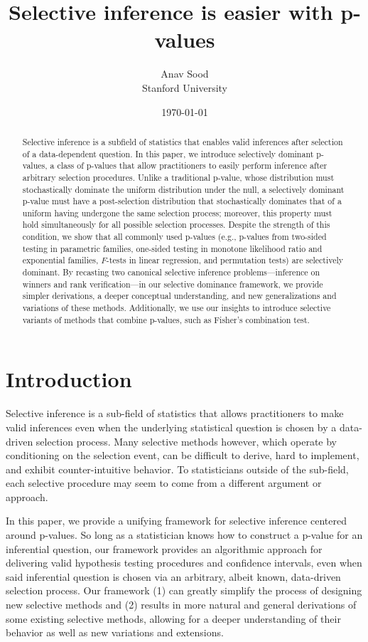 \documentclass{article}
\title{Selective inference is easier with p-values}
\author{Anav Sood\\ Stanford University}
\date{\today}
\begin{document}
\maketitle

\begin{abstract}
Selective inference is a subfield of statistics that enables valid inferences after selection of a data-dependent question. In this paper, we introduce selectively dominant p-values, a class of p-values that allow practitioners to easily perform inference after arbitrary selection procedures. Unlike a traditional p-value, whose distribution must stochastically dominate the uniform distribution under the null, a selectively dominant p-value must have a  post-selection distribution that stochastically dominates that of a uniform having undergone the same selection process; moreover, this property must hold simultaneously for all possible selection processes. Despite the strength of this condition, we show that all commonly used p-values (e.g., p-values from two-sided testing in parametric families, one-sided testing in monotone likelihood ratio and exponential families, $F$-tests in linear regression, and permutation tests) are selectively dominant. By recasting two canonical selective inference problems—inference on winners and rank verification—in our selective dominance framework, we provide simpler derivations, a deeper conceptual understanding, and new generalizations and variations of these methods. Additionally, we use our insights to introduce selective variants of methods that combine p-values, such as Fisher's combination test. 
\end{abstract}


\section{Introduction}

Selective inference is a sub-field of statistics that allows practitioners to make valid inferences even when the underlying statistical question is chosen by a data-driven selection process. Many selective methods however, which operate by conditioning on the selection event, can be difficult to derive, hard to implement, and exhibit counter-intuitive behavior. To statisticians outside of the sub-field, each selective procedure may seem to come from a different argument or approach.

In this paper, we provide a unifying framework for selective inference centered around p-values. So long as a statistician knows how to construct a p-value for an inferential question, our framework provides an algorithmic approach for delivering valid hypothesis testing procedures and confidence intervals, even when said inferential question is chosen via an arbitrary, albeit known, data-driven selection process. Our framework (1) can greatly simplify the process of designing new selective methods and (2) results in more natural and general derivations of some existing selective methods, allowing for a deeper understanding of their behavior as well as new variations and extensions. 
\end{document}
